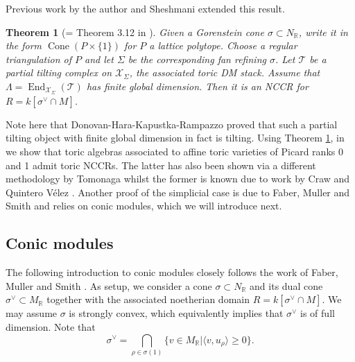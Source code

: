 \documentclass[reqno, 12pt]{amsart}
\newtheorem{theorem}{Theorem}[section]
\theoremstyle{definition}
\numberwithin{equation}{section}
\newcommand{\R}{\mathbb{R}}
\newcommand{\End}{\operatorname{End}}
\newcommand{\cone}{\operatorname{Cone}}
\begin{document}
Previous work by the author and Sheshmani \cite{MS25} extended this result.
\begin{theorem}[= Theorem 3.12 in \cite{MS25}]
    \label{Thm:ParttiltingGorCone}
    Given a Gorenstein cone $\sigma\subset N_{\R}$, write it in the form $\cone(P\times\{1\})$ for $P$ a lattice polytope.
    Choose a regular triangulation of $P$ and let $\Sigma$ be the corresponding fan refining $\sigma$. Let $\mathcal{T}$ be a partial tilting complex on $\mathcal{X}_{\Sigma}$, the associated toric DM stack. Assume that $\Lambda=\End_{\mathcal{X}_{\Sigma}}(\mathcal{T})$ has finite global dimension. Then it is an NCCR for $R=k[\sigma^\vee\cap M]$.
\end{theorem}

Note here that Donovan-Hara-Kapustka-Rampazzo \cite{DHKR25} proved that such a partial tilting object with finite global dimension in fact is tilting. Using Theorem \ref{Thm:ParttiltingGorCone}, in \cite{MS26} we show that toric algebras associated to affine toric varieties of Picard ranks 0 and 1 admit toric NCCRs. The latter has also been shown via a different methodology by Tomonaga \cite{Tomo25} whilst the former is known due to work by Craw and Quintero V\'{e}lez \cite{CQV12}. Another proof of the simplicial case is due to Faber, Muller and Smith \cite{FMS19} and relies on conic modules, which we will introduce next.

\subsection{Conic modules}\label{sec:conic}

 The following introduction to conic modules closely follows the work of Faber, Muller and Smith \cite{FMS19}. As setup, we consider a cone $\sigma\subset N_\R$ and its dual cone $\sigma^\vee\subset M_\R$ together with the associated noetherian domain $R=k[\sigma^\vee\cap M]$. We may assume $\sigma$ is strongly convex, which equivalently implies that $\sigma^\vee$ is of full dimension.  Note that \[
\sigma^\vee=\bigcap_{\rho\in\sigma(1)} \{v\in M_\R\vert \langle v,u_\rho\rangle\geq0\}.
\]
\end{document}

